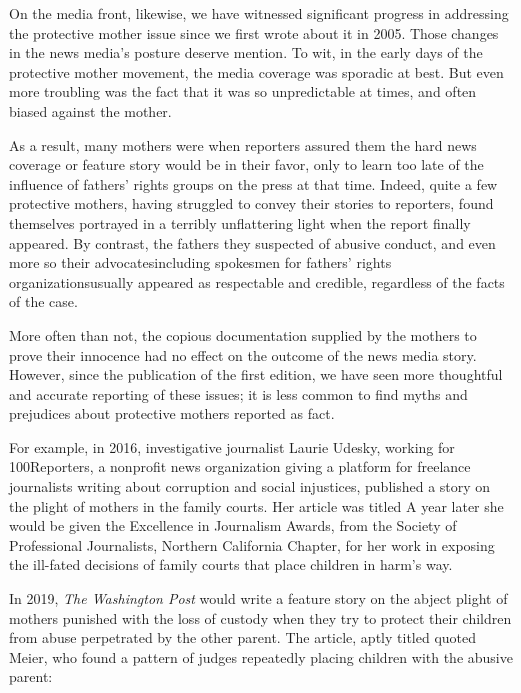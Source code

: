 \vspace{3em}

\noindent{}On the media front, likewise, we have witnessed significant progress in
addressing the protective mother issue since we first wrote about it in
2005. Those changes in the news media's posture deserve mention. To
wit, in the early days of the protective mother movement, the media
coverage was sporadic at best. But even more troubling was the fact that
it was so unpredictable at times, and often biased against the mother. \pfl{}

As a result, many mothers were  when reporters assured them
the hard news coverage or feature story would be in their favor, only
to learn too late of the influence of fathers' rights groups on the press at
that time. Indeed, quite a few protective mothers, having struggled to
convey their stories to reporters, found themselves portrayed in a 
terribly unflattering light when the report finally appeared. 
By contrast, the
fathers they suspected of abusive conduct, and even more so their 
advocates\mdash{}including spokesmen for fathers' rights organizations\mdash{}usually
appeared as respectable and credible, regardless of the facts of the case. \pfl{}


More often than not, the copious documentation supplied by the
mothers to prove their innocence had no effect on the outcome of the
news media story. However, since the publication of the first edition,
we have seen more thoughtful and accurate reporting of these issues; it
is less common to find myths and prejudices about protective mothers
reported as fact. \pfl{}


For example, in 2016, investigative journalist Laurie Udesky, working for 100Reporters, a nonprofit news organization giving a platform
for freelance journalists writing about corruption and social injustices,
published a story on the plight of mothers in the family courts. 
Her article was titled \hspace{1pt} A year later she would be given
the Excellence in Journalism Awards, from the Society of Professional
Journalists, Northern California Chapter, for her work in exposing the
ill-fated decisions of family courts that place children in harm's way. \pfl{}

In 2019, \textit{The Washington Post} would write a feature story on the abject plight of mothers punished with the loss of custody when they
try to protect their children from abuse perpetrated by the other parent. 
The article, aptly titled  quoted Meier,
who found a pattern of judges repeatedly placing children with the
abusive parent: \hspace{1pt} \pfl{}


